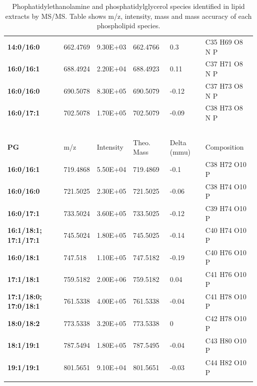 \documentclass[12pt]{ruthesis_nofloat}
\begin{document}
\begin{longtable}[]{@{}llllll@{}}
\textbf{14:0/16:0} & 662.4769 & 9.30E+03 & 662.4766 & 0.3 & C35 H69 O8 N
P\\
\textbf{16:0/16:1} & 688.4924 & 2.20E+04 & 688.4923 & 0.11 & C37 H71 O8
N P\\
\textbf{16:0/16:0} & 690.5078 & 8.30E+05 & 690.5079 & -0.12 & C37 H73 O8
N P\\
\textbf{16:0/17:1} & 702.5078 & 1.70E+05 & 702.5079 & -0.09 & C38 H73 O8
N P\\
\textbf{~} & ~ & ~ & ~ & ~ & ~\\
\textbf{PG} & m/z & Intensity & Theo. Mass & Delta (mmu) &
Composition\\
\textbf{16:0/16:1} & 719.4868 & 5.50E+04 & 719.4869 & -0.1 & C38 H72 O10
P\\
\textbf{16:0/16:0} & 721.5025 & 2.30E+05 & 721.5025 & -0.06 & C38 H74
O10 P\\
\textbf{16:0/17:1} & 733.5024 & 3.60E+05 & 733.5025 & -0.12 & C39 H74
O10 P\\
\textbf{16:1/18:1; 17:1/17:1} & 745.5024 & 1.80E+05 & 745.5025 & -0.14 &
C40 H74 O10 P\\
\textbf{16:0/18:1} & 747.518 & 1.10E+05 & 747.5182 & -0.19 & C40 H76 O10
P\\
\textbf{17:1/18:1} & 759.5182 & 2.00E+06 & 759.5182 & 0.04 & C41 H76 O10
P\\
\textbf{17:1/18:0; 17:0/18:1} & 761.5338 & 4.00E+05 & 761.5338 & -0.04 &
C41 H78 O10 P\\
\textbf{18:0/18:2} & 773.5338 & 3.20E+05 & 773.5338 & 0 & C42 H78 O10
P\\
\textbf{18:1/19:1} & 787.5494 & 1.80E+05 & 787.5495 & -0.04 & C43 H80
O10 P\\
\textbf{19:1/19:1} & 801.5651 & 9.10E+04 & 801.5651 & -0.03 & C44 H82
O10 P\\
 \caption{Phophatidylethanolamine and
phosphatidylglycerol species identified in lipid extracts by MS/MS.
Table shows m/z, intensity, mass and mass accuracy of each phospholipid
species.} \label{tab:Supplementary Table 1}

\end{longtable}
\renewcommand{\thefigure}{C1}
\end{document}
